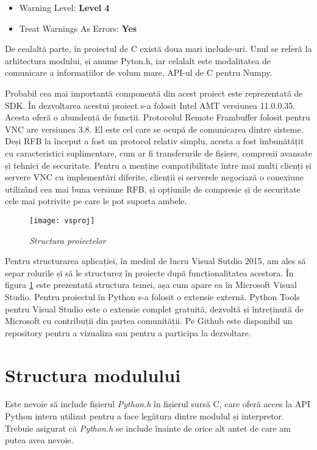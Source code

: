 \begin{itemize}
  \item Warning Level: \textbf{Level 4}
  \item Treat Warnings As Errors: \textbf{Yes}
\end{itemize}

De cealaltă parte, în proiectul de C există doua mari include-uri. Unul se referă la arhitectura modului, și anume Pyton.h, iar celalalt este modalitatea de comunicare a informațiilor de volum mare, API-ul de C pentru Numpy. 

Probabil cea mai importantă componentă din acest proiect este reprezentată de SDK. În dezvoltarea acestui proiect s-a folosit Intel AMT versiunea 11.0.0.35. Acesta oferă o abundență de funcții. Protocolul Remote Frambuffer folosit pentru VNC are versiunea 3.8. El este cel care se ocupă de comunicarea dintre sisteme.
Deși RFB la început a fost un protocol relativ simplu, acesta a fost îmbunătățit cu caracteristici suplimentare, cum ar fi transferurile de fișiere, compresii avansate și tehnici de securitate. Pentru a menține compatibilitate între mai multi clienți și servere VNC cu implementări diferite, clienții și serverele negociază o conexiune utilizând cea mai buna versiune RFB, și opțiunile de compresie și de securitate cele mai potrivite pe care le pot suporta ambele.

\begin{figure}
    \centering
    \texttt{[image: vsproj]}
    \caption{\textit{Structura proiectelor}}
    \label{vsp}
\end{figure}

Pentru structurarea aplicației, în mediul de lucru Visual Sutdio 2015, am ales să separ rolurile și să le structurez în proiecte după funcționalitatea acestora. În figura \ref{vsp} este prezentată structura temei, așa cum apare ea în Microsoft Visual Studio. Pentru proiectul în Python s-a folosit o extensie externă. Python Tools pentru Visual Studio este o extensie complet gratuită, dezvoltă și întreținută de Microsoft cu contribuții din partea comunității. Pe Github este disponibil un repository pentru a vizualiza sau pentru a participa la dezvoltare.



\section{Structura modulului}

Este nevoie să include fișierul \textit{Python.h} în fișierul sursă C, care oferă acces la API Python intern utilizat pentru a face legătura dintre modulul și interpretor. Trebuie asigurat că \textit{Python.h} se include înainte de orice alt antet de care am putea avea nevoie. 

